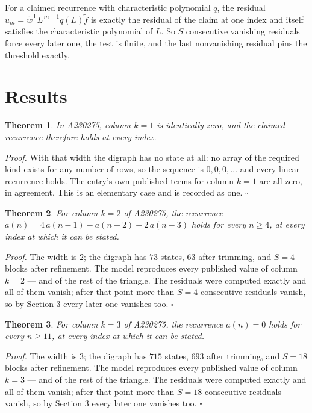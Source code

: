 \documentclass[11pt]{article}
\newtheorem{theorem}{Theorem}
\theoremstyle{definition}
\begin{document}
For a claimed recurrence with characteristic polynomial $q$, the residual $u_m = \tilde w^{\mathsf T}L^{\,m-1}q(L)\tilde f$ is exactly the residual of the claim at one index and itself satisfies the characteristic polynomial of $L$. So $S$ consecutive vanishing residuals force every later one, the test is finite, and the last nonvanishing residual pins the threshold exactly.

\section{Results}

\begin{theorem} In A230275, column $k = 1$ is identically zero, and the claimed recurrence therefore holds at every index.\end{theorem}

{\itshape Proof.} With that width the digraph has no state at all: no array of the required kind exists for any number of rows, so the sequence is $0,0,0,\dots$ and every linear recurrence holds. The entry's own published terms for column $k = 1$ are all zero, in agreement. This is an elementary case and is recorded as one. $\square$

\begin{theorem} For column $k = 2$ of A230275, the recurrence $a(n) = 4\,a(n-1) - a(n-2) - 2\,a(n-3)$ holds for every $n \ge 4$, at every index at which it can be stated.\end{theorem}

{\itshape Proof.} The width is $2$; the digraph has $73$ states, $63$ after trimming, and $S = 4$ blocks after refinement. The model reproduces every published value of column $k = 2$ --- and of the rest of the triangle. The residuals were computed exactly and all of them vanish; after that point more than $S = 4$ consecutive residuals vanish, so by Section 3 every later one vanishes too. $\square$

\begin{theorem} For column $k = 3$ of A230275, the recurrence $a(n) = 0$ holds for every $n \ge 11$, at every index at which it can be stated.\end{theorem}

{\itshape Proof.} The width is $3$; the digraph has $715$ states, $693$ after trimming, and $S = 18$ blocks after refinement. The model reproduces every published value of column $k = 3$ --- and of the rest of the triangle. The residuals were computed exactly and all of them vanish; after that point more than $S = 18$ consecutive residuals vanish, so by Section 3 every later one vanishes too. $\square$
\end{document}
